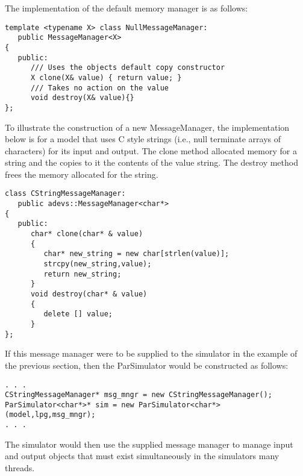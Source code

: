 The implementation of the default memory manager is as follows:
\begin{verbatim}
template <typename X> class NullMessageManager:
   public MessageManager<X>
{
   public:
      /// Uses the objects default copy constructor
      X clone(X& value) { return value; }
      /// Takes no action on the value
      void destroy(X& value){}
};
\end{verbatim}
To illustrate the construction of a new MessageManager, the implementation below is for a model that uses C style strings (i.e., null terminate arrays of characters) for its input and output. The clone method allocated memory for a string and the copies to it the contents of the value string. The destroy method frees the memory allocated for the string.
\begin{verbatim}
class CStringMessageManager:
   public adevs::MessageManager<char*>
{
   public:
      char* clone(char* & value)
      {
         char* new_string = new char[strlen(value)];
         strcpy(new_string,value);
         return new_string;
      }
      void destroy(char* & value)
      {
         delete [] value;
      }
};
\end{verbatim}
If this message manager were to be supplied to the simulator in the example of the previous section, then the ParSimulator would be constructed as follows:
\begin{verbatim}
. . .
CStringMessageManager* msg_mngr = new CStringMessageManager();
ParSimulator<char*>* sim = new ParSimulator<char*>(model,lpg,msg_mngr);
. . .
\end{verbatim}
The simulator would then use the supplied message manager to manage input and output objects that must exist simultaneously in the simulators many threads.

